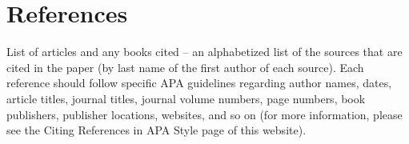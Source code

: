 \documentclass[12pt]{article}
\begin{document}
\section*{References}
List of articles and any books cited – an alphabetized list of the sources that are cited in the paper (by last name of the first author of each source).  Each reference should follow specific APA guidelines regarding author names, dates, article titles, journal titles, journal volume numbers, page numbers, book publishers, publisher locations, websites, and so on (for more information, please see the Citing References in APA Style page of this website).
\end{document}
